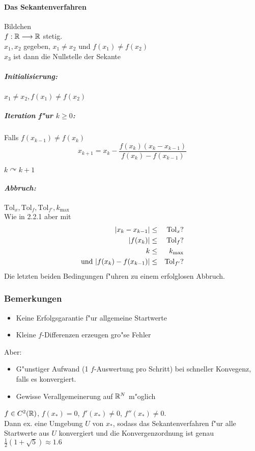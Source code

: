 \documentclass{scrartcl}
\begin{document}
\paragraph{Das Sekantenverfahren}
Bildchen \\
$f: \mathbb{R} \longrightarrow \mathbb{R}$ stetig. \\
$x_1, x_2$ gegeben, $x_1 \neq x_2$ und $f(x_1) \neq f(x_2)$ \\
$x_3$ ist dann die Nullstelle der Sekante

\subparagraph*{Initialisierung:}
$x_1 \neq x_2, f(x_1) \neq f(x_2)$
\subparagraph*{Iteration f"ur $k \geq 0$:} 
\begin{1aufz}
\item Falls $f(x_{k-1}) \neq f(x_k)$ 
$$x_{k+1} = x_k - \frac{f(x_k) (x_k - x_{k-1})}{f(x_k) - f(x_{k-1})} $$
\item $k \curvearrowright k+1$
\end{1aufz}

\subparagraph*{Abbruch:} $\mathrm{Tol}_x, \mathrm{Tol}_f, \mathrm{Tol}_{f'}, k_\mathrm{max}$ \\
Wie in 2.2.1 aber mit 
\begin{eqnarray*}
\vert x_k - x_{k-1} \vert & \leq & \mathrm{Tol}_x ? \\
\vert f(x_k) \vert & \leq & \mathrm{Tol}_f ? \\
k & \leq & k_\mathrm{max} \\
\mathrm{und \ }  \vert f(x_k) - f(x_{k-1}) \vert & \leq & \mathrm{Tol}_{f'} ?
\end{eqnarray*}
Die letzten beiden Bedingungen f"uhren zu einem erfolglosen Abbruch.

\subsubsection*{Bemerkungen}
\begin{itemize}
\item Keine Erfolgsgarantie f"ur allgemeine Startwerte
\item Kleine $f$-Differenzen erzeugen gro"se Fehler
\end{itemize}
Aber:
\begin{itemize}
\item G"unstiger Aufwand (1 $f$-Auswertung pro Schritt) bei schneller Konvegenz, falls es konvergiert. 
\item Gewisse Verallgemeinerung auf $\mathbb{R}^N$ m"oglich
\end{itemize}

\begin{Satz}
$f \in C^2(\mathbb{R})$, $f(x_*) = 0$, $f'(x_*) \neq 0$, $f''(x_*) \neq 0$. \\
Dann ex. eine Umgebung $U$ von $x_*$, sodass das Sekantenverfahren f"ur alle Startwerte aus $U$ konvergiert und die Konvergenzordnung ist genau $\frac12 (1 + \sqrt5) \approx 1.6$
\end{Satz}
\end{document}
